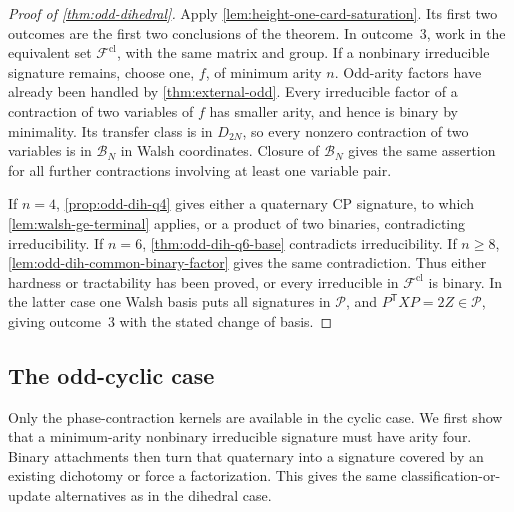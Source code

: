\documentclass[11pt,letterpaper,onecolumn]{article}
\theoremstyle{plain}
\theoremstyle{definition}
\theoremstyle{remark}
\newcommand{\cF}{\mathcal F}
\newcommand{\cP}{\mathscr P}
\begin{document}
	\begin{proof}[Proof of \cref{thm:odd-dihedral}]
		Apply \cref{lem:height-one-card-saturation}.  Its first two outcomes are
		the first two conclusions of the theorem.  In outcome~3, work in the
		equivalent set \(\cF^{\mathrm{cl}}\), with the same matrix and
		group.  If a nonbinary irreducible signature remains, choose one, \(f\), of minimum arity
		\(n\).  Odd-arity factors have already been handled by \cref{thm:external-odd}.  Every irreducible factor of a contraction of two variables of \(f\)
		has smaller arity, and hence is binary by minimality.  Its transfer class is in
		\(D_{2N}\), so every nonzero contraction of two variables is in \(\mathcal B_N\) in Walsh
		coordinates.  Closure of \(\mathcal B_N\) gives the same assertion for
		all further contractions involving at least one variable pair.
		
		If \(n=4\), \cref{prop:odd-dih-q4} gives either a quaternary CP signature, to which \cref{lem:walsh-ge-terminal} applies, or a product of
		two binaries, contradicting irreducibility.  If \(n=6\),
		\cref{thm:odd-dih-q6-base} contradicts irreducibility.  If \(n\ge8\),
		\cref{lem:odd-dih-common-binary-factor} gives the same contradiction.
		Thus either hardness or tractability has been proved, or every irreducible
		in \(\cF^{\mathrm{cl}}\) is
		binary.  In the latter case one Walsh basis puts all signatures in \(\cP\),
		and \(P^{\mathsf T}XP=2Z\in\cP\), giving outcome~3 with the stated change of basis.
	\end{proof}
	
	\subsection{The odd-cyclic case}
	
	Only the phase-contraction kernels are available in the cyclic case. We
	first show that a minimum-arity nonbinary irreducible signature must have
	arity four. Binary attachments then turn that quaternary into a signature
	covered by an existing dichotomy or force a factorization. This gives the
	same classification-or-update alternatives as in the dihedral case.
\end{document}
